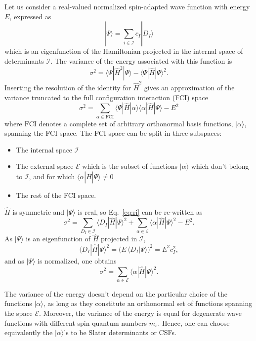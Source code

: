 \documentclass[aip,jcp,reprint,showkeys]{revtex4-1}
\newcommand{\ket}[1]{|#1\rangle}
\newcommand{\csf}{CSF}
\newcommand{\mel}[3]{\langle #1 | #2 | #3 \rangle}
\begin{document}
Let us consider a real-valued normalized spin-adapted wave function with
energy $E$, expressed as
\begin{equation}
\ket{\Psi} = \sum_{i \in \mathcal{I}} c_I \ket{D_I}
\end{equation}
which is an eigenfunction of the Hamiltonian projected in the internal space of
determinants $\mathcal{I}$.
The variance of the energy associated with this function is
\begin{equation}
\sigma^2 = \mel{\Psi}{\hat{H}^2}{\Psi} - \mel{\Psi}{\hat{H}}{\Psi}^2 .
\end{equation}
Inserting the resolution of the identity for $\hat{H}^2$ gives an
approximation of the variance truncated to the full configuration interaction (FCI) space
\begin{equation}
\sigma^2 = \sum_{\alpha \in \text{FCI}} \mel{\Psi}{\hat{H}}{\alpha} \mel{\alpha}{\hat{H}}{\Psi} - E^2
\label{eq:ri}
\end{equation}
where $\text{FCI}$ denotes a complete set of arbitrary orthonormal basis
functions, $\ket{\alpha}$, spanning the FCI space.
The FCI space can be split in three subspaces:
\begin{itemize}
\item The internal space $\mathcal{I}$
\item The external space $\mathcal{E}$ which is the subset of functions
      $\ket{\alpha}$ which don't belong to $\mathcal{I}$, and for which
      $\mel{\alpha}{\hat{H}}{\Psi} \ne 0$
\item The rest of the FCI space.
\end{itemize}
$\hat{H}$ is symmetric and $\ket{\Psi}$ is real, so Eq.~\eqref{eq:ri} can be
re-written as
\begin{equation}
\sigma^2 = \sum_{D_I    \in \mathcal{I}} \mel{D_I}{\hat{H}}{\Psi}^2 
         + \sum_{\alpha \in \mathcal{E}} \mel{\alpha}{\hat{H}}{\Psi}^2 - E^2.
\end{equation}
As $\ket{\Psi}$ is an eigenfunction of $\hat{H}$ projected in $\mathcal{I}$, 
\begin{equation}
\mel{D_I}{\hat{H}}{\Psi}^2 = \big( E\, \langle D_I | \Psi \rangle \big)^2 = E^2 c_I^2,
\end{equation}
and as $\ket{\Psi}$ is normalized, one obtains
\begin{equation}
\sigma^2 = \sum_{\alpha \in \mathcal{E}} \mel{\alpha}{\hat{H}}{\Psi}^2.
\end{equation} 

The variance of the energy doesn't depend on the particular choice of the
functions $\ket{\alpha}$, as long as they constitute an orthonormal set of
functions spanning the space $\mathcal{E}$. Moreover, the variance of the
energy is equal for degenerate wave functions with different spin quantum
numbers $m_s$.  Hence, one can choose equivalently the $\ket{\alpha}$'s to be
Slater determinants or \csf s.
\end{document}
